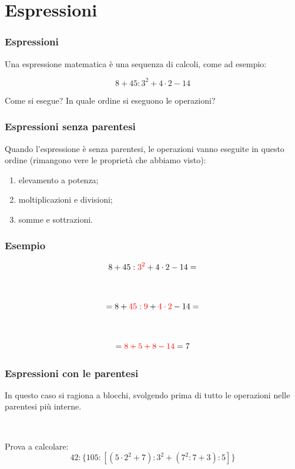 \documentclass[handout]{beamer}
\theoremstyle{plain}
\begin{document}
\section{Espressioni}

\begin{frame}
\frametitle{Espressioni}
Una espressione matematica è una sequenza di calcoli, come ad esempio:

\[8+45:3^2+4\cdot 2-14\]
  
Come si esegue? In quale ordine si eseguono le operazioni?
\end{frame}


\begin{frame}
\frametitle{Espressioni senza parentesi}
Quando l'espressione è senza parentesi, le operazioni vanno eseguite in questo ordine (rimangono vere le proprietà che abbiamo visto):
\begin{enumerate}
  \item elevamento a potenza;
  \item moltiplicazioni e divisioni;
  \item somme e sottrazioni.
\end{enumerate}
\end{frame}


\begin{frame}
\frametitle{Esempio}

\[8+45:\textcolor{red}{3^2}+4\cdot 2-14 = \]\pause

~

\[= 8+\textcolor{red}{45:9}+\textcolor{red}{4\cdot 2}-14 = \]\pause

~

\[= \textcolor{red}{8+5+8-14} = 7 \]
\end{frame}


\begin{frame}
\frametitle{Espressioni con le parentesi}
In questo caso si \alert{ragiona a blocchi}, svolgendo prima di tutto le operazioni nelle parentesi più interne.\pause

~

Prova a calcolare:
\[ 42 : \{ 105 : [(5 \cdot 2^2 + 7) : 3^2 + (7^2 : 7 + 3) : 5] \} \]
\end{frame}
\end{document}
